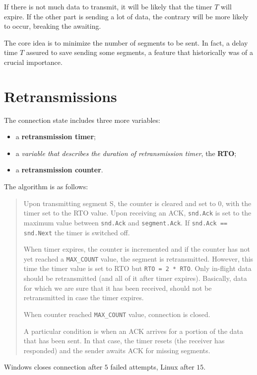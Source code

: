 \documentclass[a4paper, 11pt]{report}
\begin{document}
If there is not much data to transmit, it will be likely that the timer $T$
will expire. If the other part is sending a lot of data, the contrary will be
more likely to occur, breaking the awaiting.

The core idea is to minimize the number of segments to be sent. In fact, a
delay time $T$ assured to save sending some segments, a feature that
historically was of a crucial importance.

\section{Retransmissions}

The connection state includes three more variables:

\begin{itemize}
	\item a \textbf{retransmission timer};
	\item a \emph{variable that describes the duration of retransmission
		timer}, the \textbf{RTO};
	\item a \textbf{retransmission counter}.
\end{itemize}

The algorithm is as follows:

\begin{quote}
Upon transmitting segment S, the counter is cleared and set to $0$, with the
timer set to the RTO value. Upon receiving an ACK, \texttt{snd.Ack} is set to
the maximum value between \texttt{snd.Ack} and \texttt{segment.Ack}. If
\texttt{snd.Ack == snd.Next} the timer is switched off.

When timer expires, the counter is incremented and if the counter has not yet
reached a \texttt{MAX\_COUNT} value, the segment is retransmitted. However, this
time the timer value is set to RTO but \texttt{RTO = 2 * RTO}. Only in-flight data
should be retransmitted (and all of it after timer expires). Basically, data
for which we are sure that it has been received, should not be retransmitted in
case the timer expires.

When counter reached \texttt{MAX\_COUNT} value, connection is closed.

A particular condition is when an ACK arrives for a portion of the data that
has been sent. In that case, the timer resets (the receiver has responded) and
the sender awaits ACK for missing segments.
\end{quote}

Windows closes connection after $5$ failed attempts, Linux after $15$.
\end{document}
